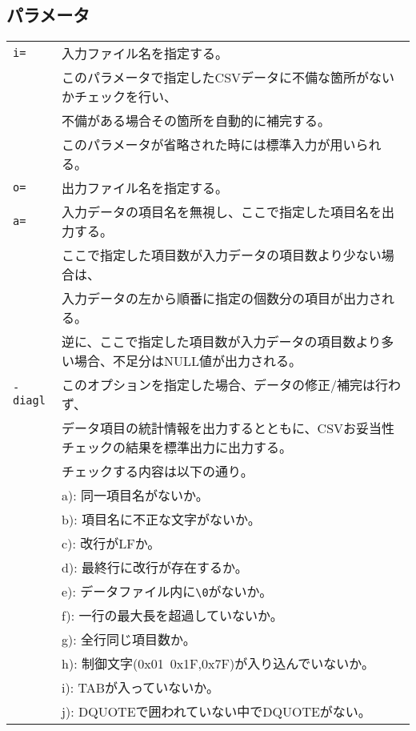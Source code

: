 \subsection*{パラメータ}
\begin{table}[htbp]
{\small
\begin{tabular}{ll}
\verb|i=|    & 入力ファイル名を指定する。\\
             & このパラメータで指定したCSVデータに不備な箇所がないかチェックを行い、\\
             & 不備がある場合その箇所を自動的に補完する。\\
             & このパラメータが省略された時には標準入力が用いられる。\\
\verb|o=|    & 出力ファイル名を指定する。\\
\verb|a=|    & 入力データの項目名を無視し、ここで指定した項目名を出力する。\\
             & ここで指定した項目数が入力データの項目数より少ない場合は、\\
             & 入力データの左から順番に指定の個数分の項目が出力される。\\
             & 逆に、ここで指定した項目数が入力データの項目数より多い場合、不足分はNULL値が出力される。\\
\verb|-diagl| &このオプションを指定した場合、データの修正/補完は行わず、\\
             & データ項目の統計情報を出力するとともに、CSVお妥当性チェックの結果を標準出力に出力する。\\
             & チェックする内容は以下の通り。\\
             & a): 同一項目名がないか。\\
             & b): 項目名に不正な文字がないか。\\
             & c): 改行がLFか。\\
             & d): 最終行に改行が存在するか。\\
             & e): データファイル内に\verb|\0|がないか。\\
             & f): 一行の最大長を超過していないか。\\
             & g): 全行同じ項目数か。\\
             & h): 制御文字(0x01~0x1F,0x7F)が入り込んでいないか。\\
             & i): TABが入っていないか。\\
             & j): DQUOTEで囲われていない中でDQUOTEがない。\\

\end{tabular}}
\end{table}
